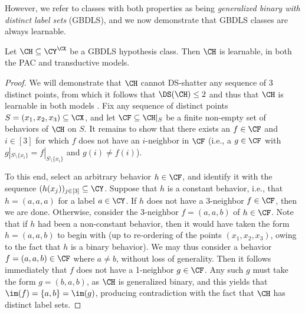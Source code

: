 However, we refer to classes with both properties as being \emph{generalized binary with distinct label sets} (GBDLS), and we now demonstrate that GBDLS classes are always learnable. 

\begin{proposition}\label{Proposition:GBDLS-means-learnable}
Let $\CH \subseteq \CY^\CX$ be a GBDLS hypothesis class. Then $\CH$ is learnable, in both the PAC and transductive models. 
\end{proposition}
\begin{proof}
We will demonstrate that $\CH$ cannot DS-shatter any sequence of 3 distinct points, from which it follows that $\DS(\CH) \leq 2$ and thus that $\CH$ is learnable in both models \citep{brukhim2022characterization}. Fix any sequence of distinct points $S = (x_1, x_2, x_3) \subseteq \CX$, and let $\CF \subseteq \CH|_S$ be a finite non-empty set of behaviors of $\CH$ on $S$. It remains to show that there exists an $f \in \CF$ and $i \in [3]$ for which $f$ does not have an $i$-neighbor in $\CF$ (i.e., a $g \in \CF$ with $g|_{S \setminus \{x_i\}} = f|_{S \setminus \{x_i\}}$ and $g(i) \neq f(i)$). 

To this end, select an arbitrary behavior $h \in \CF$, and identify it with the sequence $(h(x_j))_{j \in [3]} \subseteq \CY$. Suppose that $h$ is a constant behavior, i.e., that $h = (a, a, a)$ for a label $a \in \CY$. If $h$ does not have a 3-neighbor $f \in \CF$, then we are done. Otherwise, consider the 3-neighbor $f = (a, a, b)$ of $h \in \CF$. Note that if $h$ had been a non-constant behavior, then it would have taken the form $h = (a, a, b)$ to begin with (up to re-ordering of the points $(x_1, x_2, x_3)$, owing to the fact that $h$ is a binary behavior). We may thus consider a behavior $f = (a, a, b) \in \CF$ where $a \neq b$, without loss of generality. Then it follows immediately that $f$ does not have a 1-neighbor $g \in \CF$. Any such $g$ must take the form $g = (b, a, b)$, as $\CH$ is generalized binary, and this yields that $\im(f) = \{a, b\} = \im(g)$, producing contradiction with the fact that $\CH$ has distinct label sets. 
\end{proof}

